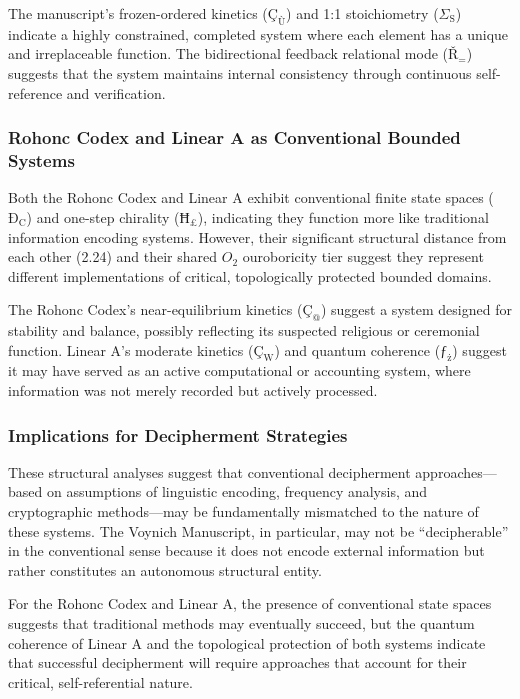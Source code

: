 \documentclass[12pt,a4paper]{article}
\begin{document}
The manuscript's frozen-ordered kinetics ($\text{Ç}_{\text{Ù}}$) and 1:1 stoichiometry ($\Sigma_{\text{S}}$) indicate a highly constrained, completed system where each element has a unique and irreplaceable function. The bidirectional feedback relational mode ($\text{Ř}_{\text{=}}$) suggests that the system maintains internal consistency through continuous self-reference and verification.

\subsubsection{Rohonc Codex and Linear A as Conventional Bounded Systems}

Both the Rohonc Codex and Linear A exhibit conventional finite state spaces ($\text{Ð}_{\text{C}}$) and one-step chirality ($\text{Ħ}_{\text{£}}$), indicating they function more like traditional information encoding systems. However, their significant structural distance from each other (2.24) and their shared $O_2$ ouroboricity tier suggest they represent different implementations of critical, topologically protected bounded domains.

The Rohonc Codex's near-equilibrium kinetics ($\text{Ç}_{\text{@}}$) suggest a system designed for stability and balance, possibly reflecting its suspected religious or ceremonial function. Linear A's moderate kinetics ($\text{Ç}_{\text{W}}$) and quantum coherence ($\text{ƒ}_{\text{ż}}$) suggest it may have served as an active computational or accounting system, where information was not merely recorded but actively processed.

\subsubsection{Implications for Decipherment Strategies}

These structural analyses suggest that conventional decipherment approaches---based on assumptions of linguistic encoding, frequency analysis, and cryptographic methods---may be fundamentally mismatched to the nature of these systems. The Voynich Manuscript, in particular, may not be ``decipherable'' in the conventional sense because it does not encode external information but rather constitutes an autonomous structural entity.

For the Rohonc Codex and Linear A, the presence of conventional state spaces suggests that traditional methods may eventually succeed, but the quantum coherence of Linear A and the topological protection of both systems indicate that successful decipherment will require approaches that account for their critical, self-referential nature.
\end{document}
